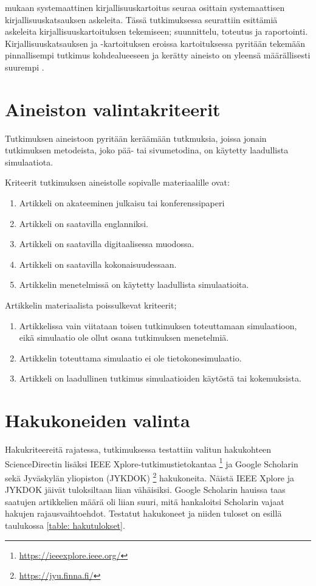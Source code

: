 \documentclass[utf8]{gradu3}
\begin{document}
\textcite{keele2007guidelines} mukaan systemaattinen kirjallisuuskartoitus seuraa
osittain systemaattisen kirjallisuuskatsauksen askeleita.
Tässä tutkimuksessa seurattiin \textcite{keele2007guidelines} esittämiä askeleita kirjallisuuskartoituksen tekemiseen; suunnittelu, toteutus ja raportointi.
Kirjallisuuskatsauksen ja -kartoituksen eroissa kartoituksessa pyritään tekemään 
pinnallisempi tutkimus kohdealueeseen ja kerätty aineisto on 
yleensä määrällisesti suurempi \parencite{keele2007guidelines}.

\section{Aineiston valintakriteerit} \label{valintakriteerit}
Tutkimuksen aineistoon pyritään keräämään tutkmuksia, joissa jonain tutkimuksen metodeista, joko pää- tai sivumetodina, on käytetty laadullista simulaatiota.

Kriteerit tutkimuksen aineistolle sopivalle materiaalille ovat:
\begin{enumerate}
    \item Artikkeli on akateeminen julkaisu tai konferenssipaperi
    \item Artikkeli on saatavilla englanniksi.
    \item Artikkeli on saatavilla digitaalisessa muodossa.
    \item Artikkeli on saatavilla kokonaisuudessaan.
    \item Artikkelin menetelmissä on käytetty laadullista simulaatioita.
\end{enumerate}

Artikkelin materiaalista poissulkevat kriteerit;
\begin{enumerate}
    \item Artikkelissa vain viitataan toisen tutkimuksen toteuttamaan simulaatioon, eikä simulaatio ole ollut osana tutkimuksen menetelmiä.
    \item Artikkelin toteuttama simulaatio ei ole tietokonesimulaatio.
    \item Artikkeli on laadullinen tutkimus simulaatioiden käytöstä tai kokemuksista.
\end{enumerate}

\section{Hakukoneiden valinta} \label{hakukoneiden valinta}
Hakukriteereitä rajatessa, tutkimuksessa testattiin valitun hakukohteen ScienceDirectin lisäksi IEEE Xplore-tutkimustietokantaa 
\footnote{\url{https://ieeexplore.ieee.org/}} ja Google Scholarin 
sekä Jyväskylän yliopiston (JYKDOK) \footnote{\url{https://jyu.finna.fi/}} hakukoneita. Näistä IEEE Xplore ja JYKDOK jäivät tuloksiltaan liian vähäisiksi.
Google Scholarin hauissa taas saatujen artikkelien määrä oli liian suuri, 
mitä hankaloitsi Scholarin vajaat hakujen rajausvaihtoehdot. 
Testatut hakukoneet ja niiden tuloset on esillä taulukossa \ref{table: hakutulokset}.
\end{document}
